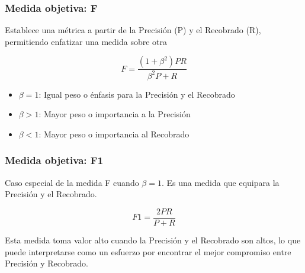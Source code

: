 \documentclass[
10pt, %
aspectratio=169, %
]{beamer}
\begin{document}
	\begin{frame}
		
		\frametitle{Medida objetiva: F}
		
		Establece una métrica a partir de la Precisión (P) y el Recobrado (R), permitiendo enfatizar una medida sobre otra
		
		$$
			F = 
			\frac{(1 + \beta^2)PR}{\beta^2 P + R} 
		$$ 
		
		\vspace{2\baselineskip}
		\begin{itemize}
			\item $\beta = 1$: Igual peso o énfasis para la Precisión y el Recobrado
			\item $\beta > 1$: Mayor peso o importancia a la Precisión
			\item $\beta < 1$: Mayor peso o importancia al Recobrado
		\end{itemize}
		
	\end{frame}
	
	\begin{frame}
		
		\frametitle{Medida objetiva: F1}
		
		Caso especial de la medida F cuando $\beta = 1$. Es una medida que equipara la Precisión y el Recobrado.
		
		$$
			F1 
			= \frac{2PR}{P+R}
		$$
		
		\vspace{2\baselineskip}
		Esta medida toma valor alto cuando la Precisión y el Recobrado son altos, lo que puede interpretarse como un esfuerzo por encontrar el mejor compromiso entre Precisión y Recobrado. 
		
	\end{frame}
	
\end{document}
